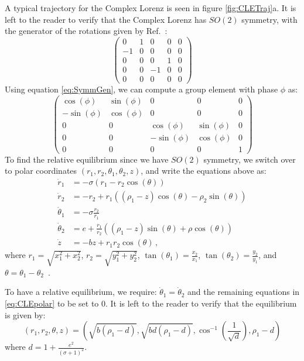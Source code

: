 \documentclass[10pt,letter]{article}
\begin{document}
A typical trajectory for the Complex Lorenz is seen in figure \ref{fig:CLETraj}a.  It is left to the reader to verify that the Complex Lorenz has $SO(2)$ symmetry, with the generator of the rotations given by Ref.~\cite{CB}:
\[ \left( \begin{array}{ccccc}
0 & 1 & 0 & 0 & 0 \\
-1 & 0 & 0 & 0 & 0 \\
0 & 0 & 0 & 1 & 0\\
0 & 0 & -1 & 0 & 0 \\
0 & 0 & 0 & 0 & 0\end{array} \right)\]
Using equation \ref{eq:SymmGen}, we can compute a group element with
phase $\phi$ as:
\begin{equation}
\left(
\begin{array}{ccccc}
\cos(\phi) & \sin(\phi) & 0 & 0 & 0 \\
-\sin(\phi) & \cos(\phi) & 0 & 0 & 0 \\
0 & 0 & \cos(\phi) & \sin(\phi) & 0\\
0 & 0 & -\sin(\phi) & \cos(\phi) & 0 \\
0 & 0 & 0 & 0 & 1
\end{array}\right)
\end{equation}
To find the relative equilibrium since we have $SO(2)$ symmetry, we
switch over to polar coordinates $(r_1, r_2, \theta_1, \theta_2, z)$, and
write the equations above as:
\begin{equation}
\begin{split}
  \dot r_1 &= -\sigma(r_1 - r_2\cos(\theta)) \\
  \dot r_2 &=   -r_2 + r_1((\rho_1 - z)\cos(\theta) - \rho_2\sin(\theta)) \\
  \dot \theta_1 &= -\sigma \frac{r_2}{r_1} \\
  \dot \theta_2 &= e + \frac{r_1}{r_2}((\rho_1 - z)\sin(\theta)+\rho\cos(\theta)) \\
  \dot z &= -bz  + r_1r_2\cos(\theta) \,,
    \label{eq:CLEpolar}
\end{split}
\end{equation}
where $r_1 = \sqrt{x_1^2 + x_2^2}$, $r_2 = \sqrt{y_1^2 + y_2^2}$,
$\tan(\theta_1) = \frac{x_2}{x_1}$, $\tan(\theta_2) = \frac{y_2}{y_1}$,
and $\theta = \theta_1-\theta_2$~\cite{CB}.

To have a relative equilibrium, we require: $\dot \theta_1 = \dot
\theta_2$ and the remaining equations in \ref{eq:CLEpolar} to be set to
$0$. It is left to the reader to verify that the equilibrium is given by:
\begin{equation}
(r_1, r_2, \theta, z) = (\sqrt{b(\rho_1-d)}, \sqrt{bd(\rho_1-d)}, \cos^{-1}(\frac{1}{\sqrt{d}}), \rho_1 - d)
\end{equation}
where $d = 1+ \frac{e^2}{(\sigma+1)^2}$.
\end{document}
